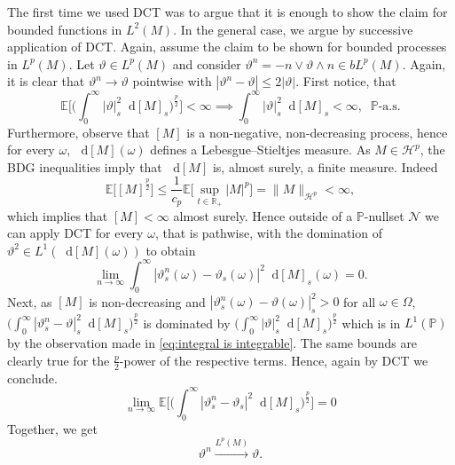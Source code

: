 \documentclass[11pt,a4paper,twoside,openany]{report}
\numberwithin{equation}{section}
\newcommand{\diff}{\mathop{}\!\mathrm{d}}
\theoremstyle{plain} %
\theoremstyle{definition} %
\theoremstyle{remark} %
\begin{document}
The first time we used DCT was to argue that it is enough to show the claim for bounded functions in \(L^2(M)\). In the general case, we argue by successive application of DCT. 
Again, assume the claim to be shown for bounded processes in \(L^p(M)\). Let \(\vartheta\in L^p(M)\) and consider \(\vartheta^n=-n\vee \vartheta\wedge n\in bL^p(M)\). Again, it is clear that \(\vartheta^n\to\vartheta\) pointwise with \(|\vartheta^n-\vartheta|\leq 2|\vartheta|\). First notice, that 
\begin{equation}\label{eq:integral is integrable}
    \mathbb{E}\Big[\Big(\int_0^{\infty}|\vartheta|_s^2\diff [M]_s\Big)^{\frac{p}{2}}\Big]<\infty\implies\int_0^{\infty}|\vartheta|_s^2\diff [M]_s<\infty,\;\;\mathbb{P}\text{-a.s.}
\end{equation}
 Furthermore, observe that \([M]\) is a non-negative, non-decreasing process, hence for every \(\omega\), \(\diff [M](\omega)\) defines a Lebesgue–Stieltjes measure. As \(M\in\mathcal{H}^p\), the BDG inequalities imply that \(\diff [M]\) is, almost surely, a finite measure. 
 Indeed
 \begin{equation*}
    \mathbb{E}\big[[M]^{\frac{p}{2}}\big]\leq \frac{1}{c_p}\mathbb{E}\Big[\sup_{t\in\mathbb{R}_+}|M|^p\Big]=\lVert M\rVert_{\mathcal{H}^p}<\infty,
\end{equation*}
which implies that \([M]<\infty\) almost surely. 
Hence outside of a \(\mathbb{P}\)-nullset  \(\mathcal{N}\) we can apply DCT for every \(\omega\), that is pathwise, with the domination of \(\vartheta^2\in L^1(\diff [M](\omega)) \) to obtain
\begin{equation*}
    \lim_{n\to\infty}\int_{0}^{\infty}|\vartheta_s^n(\omega)-\vartheta_s(\omega)|^2\diff [M]_s(\omega)=0.
\end{equation*}
Next, as \([M]\) is non-decreasing and \(|\vartheta_s^n(\omega)-\vartheta(\omega)|_s^2>0\) for all \(\omega\in\Omega\),
\(\big(\int_0^{\infty}|\vartheta_s^n-\vartheta|_s^2\diff [M]_s\big)^{\frac{p}{2}}\) is dominated by \(\big(\int_0^{\infty}|\vartheta|_s^2\diff [M]_s\big)^{\frac{p}{2}}\) which is in \(L^1(\mathbb{P})\) by the observation made in \eqref{eq:integral is integrable}. The same bounds are clearly true for the \(\frac{p}{2}\)-power of the respective terms. Hence, again by DCT we conclude.
\begin{equation*}
    \lim_{n\to\infty}\mathbb{E}\Big[\Big(\int_0^{\infty}|\vartheta^n_s-\vartheta_s|^2\diff[M]_s\Big)^{\frac{p}{2}}\Big]=0
\end{equation*}
Together, we get
\begin{equation*}
    \vartheta^n\overset{L^p(M)}{\to}\vartheta.
\end{equation*}
\end{document}

